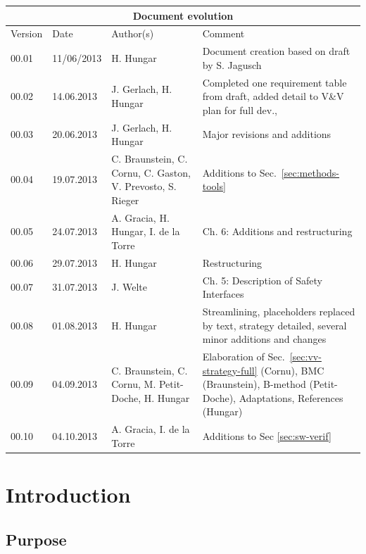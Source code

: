 \documentclass{template/openetcs_report}
\begin{document}
\begin{tabular}{|p{1.5cm}|p{2cm}|p{3.5cm}|p{6cm}|}
\hline
\multicolumn{4}{|c|}{Document evolution} \\
\hline
Version &  Date & Author(s) & Comment  \\
\hline  
00.01 & 11/06/2013 & H. Hungar &  Document creation based on draft by
S. Jagusch\\
\hline
00.02 & 14.06.2013 & J. Gerlach, H. Hungar &  Completed one
requirement table from draft, added detail to V\&V plan for full dev., \\
\hline  
00.03 & 20.06.2013 & J. Gerlach, H. Hungar & Major revisions and
additions
\\\hline
00.04 & 19.07.2013 & C. Braunstein, C. Cornu, C. Gaston, V. Prevosto,
S. Rieger & Additions to Sec.~\ref{sec:methods-tools}
\\\hline
00.05 & 24.07.2013 & A. Gracia, H. Hungar, I. de la Torre & Ch. 6: Additions and
restructuring 
\\\hline
00.06 & 29.07.2013 & H. Hungar & Restructuring
\\\hline
00.07 & 31.07.2013 & J. Welte & Ch. 5: Description of Safety Interfaces
\\\hline
00.08 & 01.08.2013 & H. Hungar & Streamlining, placeholders replaced
by text, strategy detailed, several minor additions and changes
\\\hline
00.09 & 04.09.2013 & C. Braunstein, C. Cornu, M. Petit-Doche, H. Hungar & Elaboration of
Sec.~\ref{sec:vv-strategy-full} (Cornu), BMC (Braunstein), B-method
(Petit-Doche), Adaptations, References (Hungar)
\\
\hline
00.10 & 04.10.2013 & A. Gracia, I. de la Torre & Additions to Sec \ref{sec:sw-verif}
\\\hline
\end{tabular}




\mainmatter

\chapter{Introduction}

\section{Purpose}
\label{sec:purpose}
\end{document}

